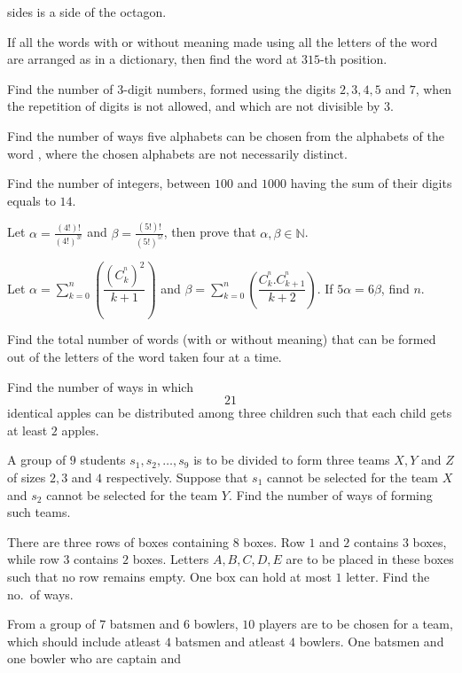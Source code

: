   sides is a side of the octagon.
\item If all the words with or without meaning made using all the letters of the word  are
  arranged as in a dictionary, then find the word at $315$-th position.
\item Find the number of $3$-digit numbers, formed using the digits $2, 3, 4, 5$ and $7$, when the
  repetition of digits is not allowed, and which are not divisible by $3$.
\item Find the number of ways five alphabets can be chosen from the alphabets of the word ,
  where the chosen alphabets are not necessarily distinct.
\item Find the number of integers, between $100$ and $1000$ having the sum of their digits equals to $14$.
\item Let $\alpha = \frac{(4!)!}{(4!)^{3!}}$ and $\beta = \frac{(5!)!}{(5!)^{5!}}$, then prove that
  $\alpha,\beta\in\mathbb{N}$.
\item Let $\alpha = \displaystyle\sum_{k = 0}^n\left(\dfrac{\left(C_k^^n\right)^2}{k + 1}\right)$ and $\beta
  = \displaystyle\sum_{k = 0}^n\left(\dfrac{C_k^^n.C_{k + 1}^^n}{k + 2}\right)$. If $5\alpha = 6\beta$, find
  $n$.
\item Find the total number of words (with or without meaning) that can be formed out of the letters of the
  word  taken four at a time.
\item Find the number of ways in which $$21$$ identical apples can be distributed among three children such
  that each child gets at least $2$ apples.
\item A group of $9$ students $s_1, s_2, \ldots, s_9$ is to be divided to form three teams $X, Y$ and $Z$ of
  sizes $2, 3$ and $4$ respectively. Suppose that $s_1$ cannot be selected for the team $X$ and $s_2$ cannot
  be selected for the team $Y$. Find the number of ways of forming such teams.
\item There are three rows of boxes containing $8$ boxes. Row $1$ and $2$ contains $3$ boxes, while row $3$
  contains $2$ boxes. Letters $A, B, C, D, E$ are to be placed in these boxes such that no row remains
  empty. One box can hold at most $1$ letter. Find the no.\ of ways.
\item From a group of $7$ batsmen and $6$ bowlers, $10$ players are to be chosen for a team, which should
  include atleast $4$ batsmen and atleast $4$ bowlers. One batsmen and one bowler who are captain and
